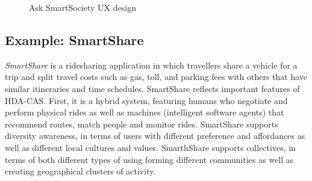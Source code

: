 \begin{figure}[!bht]
    \hfill
    \caption{Ask SmartSociety UX design}
    \label{fig:askpeer}
\end{figure}


\subsection{Example: SmartShare}
\textit{SmartShare} is a ridesharing application in which travellers share a vehicle for a trip and split travel costs such as gas, toll, and parking fees with others that have similar itineraries and time schedules. 
SmartShare reflects important features of HDA-CAS. First, it is a hybrid system, featuring humans who negotiate and perform physical rides as well as machines (intelligent software agents) that recommend routes, match people and monitor rides. SmartShare supports diversity awareness, in terms of users with different preference and affordances as well as different local cultures and values. SmarthShare supports collectives, in terms of both different types of using forming different communities as well as creating geographical clusters of activity. 
 

